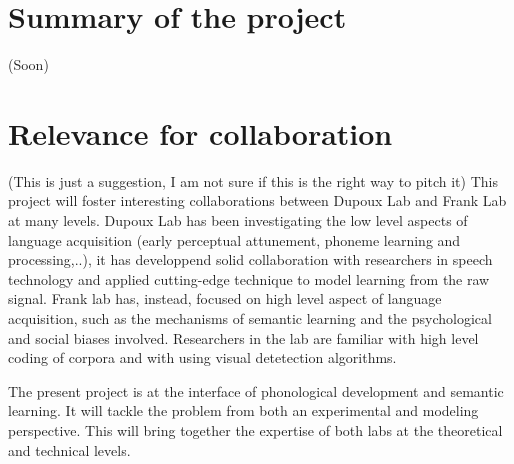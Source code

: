 \documentclass[12pt]{article}
\begin{document}
\section*{Summary of the project}
(Soon) 
\section*{Relevance for collaboration}
(This is just a suggestion, I am not sure if this is the right way to pitch it)
This project will foster interesting collaborations between Dupoux Lab and Frank Lab at many levels.
Dupoux Lab has been investigating the low level aspects of language acquisition (early perceptual attunement, phoneme learning and processing,..), it has developpend solid collaboration with researchers in speech technology and applied cutting-edge technique to model learning from the raw signal. Frank lab has, instead, focused on high level aspect of language acquisition, such as the mechanisms of semantic learning and the psychological and social biases involved. Researchers in the lab are familiar with high level coding of corpora and with using visual detetection algorithms. 

The present project is at the interface of phonological development and semantic learning. It will tackle the problem from both an experimental and modeling perspective. This will bring together the expertise of both labs at the theoretical and technical levels. 
\end{document}
